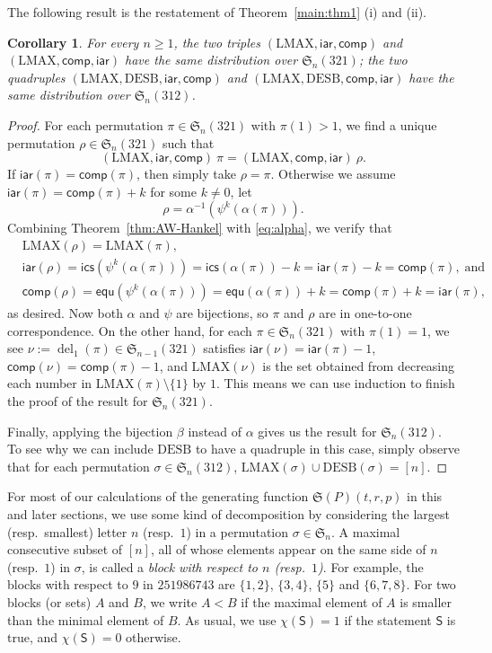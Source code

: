 \documentclass[12pt]{amsart}
\numberwithin{equation}{section}
\theoremstyle{plain}
\newtheorem{corollary}[theorem]{Corollary}
\theoremstyle{definition}
\def\S{\mathfrak{S}}
\def\iar{\mathsf{iar}}
\def\comp{\mathsf{comp}}
\def\LMAX{\mathrm{LMAX}}
\def\del{\operatorname{del}}
\def\ics{\mathsf{ics}}
\def\equ{\mathsf{equ}}
\def\DESB{\mathrm{DESB}}
\def\DESB{\mathrm{DESB}}
\begin{document}
The following result is the restatement of Theorem~\ref{main:thm1} (i) and (ii).
\begin{corollary}\label{cor:321-312-symmetry}
For every $n\ge 1$, the two triples $(\LMAX,\iar,\comp)$ and $(\LMAX,\comp,\iar)$ have the same distribution over $\S_n(321)$; the two quadruples $(\LMAX,\DESB,\iar,\comp)$ and $(\LMAX,\DESB,\comp,\iar)$ have the same distribution over $\S_n(312)$.
\end{corollary}

\begin{proof}
For each permutation $\pi\in\S_n(321)$ with $\pi(1)>1$, we find a unique permutation $\rho\in\S_n(321)$ such that $$(\LMAX,\iar,\comp)\:\pi = (\LMAX,\comp,\iar)\:\rho.$$ If $\iar(\pi)=\comp(\pi)$, then simply take $\rho=\pi$. Otherwise we assume $\iar(\pi)=\comp(\pi)+k$ for some $k\neq 0$, let $$\rho=\alpha^{-1}(\psi^k(\alpha(\pi))).$$
Combining Theorem~\ref{thm:AW-Hankel} with \eqref{eq:alpha}, we verify that
\begin{align*}
&\LMAX(\rho)=\LMAX(\pi),\\
&\iar(\rho)=\ics(\psi^k(\alpha(\pi)))=\ics(\alpha(\pi))-k=\iar(\pi)-k=\comp(\pi), \; \text{and}\\
&\comp(\rho)=\equ(\psi^k(\alpha(\pi)))=\equ(\alpha(\pi))+k=\comp(\pi)+k=\iar(\pi), 
\end{align*}
as desired. Now both $\alpha$ and $\psi$ are bijections, so $\pi$ and $\rho$ are in one-to-one correspondence. On the other hand, for each $\pi\in\S_n(321)$ with $\pi(1)=1$, we see $\nu:=\del_1(\pi)\in\S_{n-1}(321)$ satisfies $\iar(\nu)=\iar(\pi)-1$, $\comp(\nu)=\comp(\pi)-1$, and $\LMAX(\nu)$ is the set obtained from decreasing each number in $\LMAX(\pi)\setminus\{1\}$ by $1$. This means we can use induction to finish the proof of the result for $\S_n(321)$.

Finally, applying the bijection $\beta$ instead of $\alpha$ gives us the result for $\S_n(312)$. To see why we can include $\DESB$ to have a quadruple in this case, simply observe that for each permutation $\sigma\in\S_n(312)$, $\LMAX(\sigma)\cup\DESB(\sigma)=[n]$.
\end{proof}

For most of our calculations of the generating function $\S(P)(t,r,p)$ in this and later sections, we use some kind of decomposition by considering the largest (resp.~smallest) letter $n$ (resp.~$1$) in a permutation $\sigma\in\S_n$. A maximal consecutive subset of $[n]$, all of whose elements appear on the same side of $n$  (resp.~$1$) in $\sigma$, is called a {\em block with respect to $n$ (resp.~$1$)}. For example, the blocks with respect to $9$ in $251986743$ are $\{1,2\}$, $\{3, 4\}$, $\{5\}$ and $\{6, 7, 8\}$. For two blocks (or sets) $A$ and $B$, we write $A<B$ if the maximal element of $A$ is smaller than the minimal element of $B$. As usual, we use $\chi(\mathsf{S})=1$ if the statement $\mathsf{S}$ is true, and $\chi(\mathsf{S})=0$ otherwise.
\end{document}
